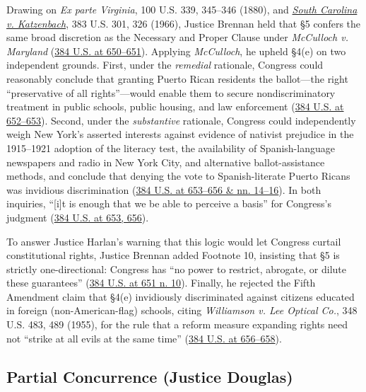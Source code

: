 \documentclass[12pt]{article}
\begin{document}
Drawing on \textit{Ex parte Virginia}, 100 U.S. 339, 345--346 (1880), and \href{https://supreme.justia.com/cases/federal/us/383/301/}{\textit{South Carolina v. Katzenbach}}, 383 U.S. 301, 326 (1966), Justice Brennan held that \S 5 confers the same broad discretion as the Necessary and Proper Clause under \textit{McCulloch v. Maryland} (\href{https://supreme.justia.com/cases/federal/us/384/641/}{384 U.S. at 650--651}). Applying \textit{McCulloch}, he upheld \S 4(e) on two independent grounds. First, under the \textit{remedial} rationale, Congress could reasonably conclude that granting Puerto Rican residents the ballot---the right ``preservative of all rights''---would enable them to secure nondiscriminatory treatment in public schools, public housing, and law enforcement (\href{https://supreme.justia.com/cases/federal/us/384/641/}{384 U.S. at 652--653}). Second, under the \textit{substantive} rationale, Congress could independently weigh New York's asserted interests against evidence of nativist prejudice in the 1915--1921 adoption of the literacy test, the availability of Spanish-language newspapers and radio in New York City, and alternative ballot-assistance methods, and conclude that denying the vote to Spanish-literate Puerto Ricans was invidious discrimination (\href{https://supreme.justia.com/cases/federal/us/384/641/}{384 U.S. at 653--656 \& nn. 14--16}). In both inquiries, ``[i]t is enough that we be able to perceive a basis'' for Congress's judgment (\href{https://supreme.justia.com/cases/federal/us/384/641/}{384 U.S. at 653, 656}).

To answer Justice Harlan's warning that this logic would let Congress curtail constitutional rights, Justice Brennan added Footnote 10, insisting that \S 5 is strictly one-directional: Congress has ``no power to restrict, abrogate, or dilute these guarantees'' (\href{https://supreme.justia.com/cases/federal/us/384/641/}{384 U.S. at 651 n. 10}). Finally, he rejected the Fifth Amendment claim that \S 4(e) invidiously discriminated against citizens educated in foreign (non-American-flag) schools, citing \textit{Williamson v. Lee Optical Co.}, 348 U.S. 483, 489 (1955), for the rule that a reform measure expanding rights need not ``strike at all evils at the same time'' (\href{https://supreme.justia.com/cases/federal/us/384/641/}{384 U.S. at 656--658}).

\subsection{Partial Concurrence (Justice Douglas)}
\end{document}
